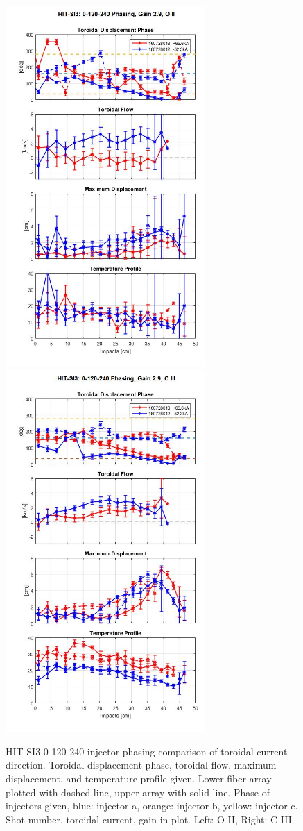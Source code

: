 \documentclass{AIAA}
\begin{document}
\begin{figure}
\includegraphics[width=3in]{160525017L1Compare_extendedRange}\nolinebreak
\includegraphics[width=3in]{160525017L2Compare_extendedRange}\caption{HIT-SI3 0-120-240 injector phasing comparison of toroidal current direction. Toroidal displacement phase, toroidal flow, maximum displacement, and temperature profile given. Lower fiber array plotted with dashed line, upper array with solid line. Phase of injectors given, blue: injector a, orange: injector b, yellow: injector c. Shot number, toroidal current, gain in plot. Left: O II, Right: C III}\label{Fig::PosNeg_HIT-SI3}
\end{figure}
\end{document}
